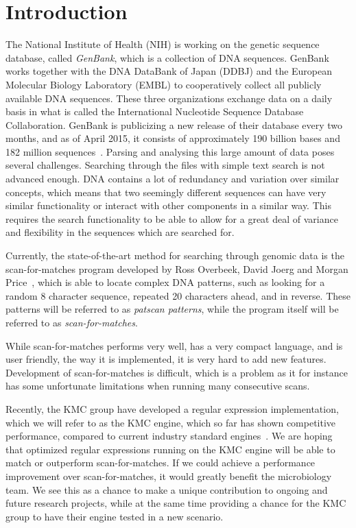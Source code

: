 \documentclass[12pt]{article}
\theoremstyle{definition}
\begin{document}
\tableofcontents
\newpage

\pagestyle{fancy}
\fancyhf{}
\cfoot{\thepage}



\section{Introduction}

The National Institute of Health (NIH) is working on the genetic sequence database, called \emph{GenBank}, which is a collection of DNA sequences. GenBank works together with the DNA DataBank of Japan (DDBJ) and the European Molecular Biology Laboratory (EMBL) to cooperatively collect all publicly available DNA sequences. These three organizations exchange data on a daily basis in what is called the International Nucleotide Sequence Database Collaboration. GenBank is publicizing a new release of their database every two months, and as of April 2015, it consists of approximately 190 billion bases and 182 million sequences~\cite{GenBank}. Parsing and analysing this large amount of data poses several challenges. Searching through the files with simple text search is not advanced enough. DNA contains a lot of redundancy and variation over similar concepts, which means that two seemingly different sequences can have very similar functionality or interact with other components in a similar way. This requires the search functionality to be able to allow for a great deal of variance and flexibility in the sequences which are searched for.

Currently, the state-of-the-art method for searching through genomic data is the scan-for-matches program developed by Ross Overbeek, David Joerg and Morgan Price~\cite{scan-for-matches}, which is able to locate complex DNA patterns, such as looking for a random 8 character sequence, repeated 20 characters ahead, and in reverse. These patterns will be referred to as \textit{patscan patterns}, while the program itself will be referred to as \textit{scan-for-matches}.

While scan-for-matches performs very well, has a very compact language, and is user friendly, the way it is implemented, it is very hard to add new features. Development of scan-for-matches is difficult, which is a problem as it for instance has some unfortunate limitations when running many consecutive scans.

Recently, the KMC group have developed a regular expression implementation, which we will refer to as the KMC engine, which so far has shown competitive performance, compared to current industry standard engines~\cite{two-pass-greedy}. We are hoping that optimized regular expressions running on the KMC engine will be able to match or outperform scan-for-matches.
If we could achieve a performance improvement over scan-for-matches, it would greatly benefit the microbiology team. We see this as a chance to make a unique contribution to ongoing and future research projects, while at the same time providing a chance for the KMC group to have their engine tested in a new scenario.
\end{document}
